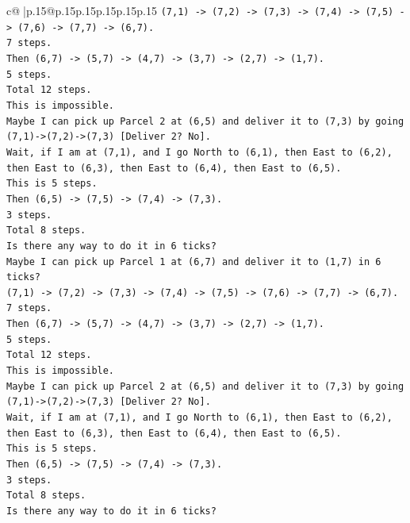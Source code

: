 \documentclass{article}
\begin{document}
{\begin{supertabular}{c@{$\;$}|p{.15\linewidth}@{}p{.15\linewidth}p{.15\linewidth}p{.15\linewidth}p{.15\linewidth}p{.15\linewidth}}
{{{\texttt{(7,1) {-}> (7,2) {-}> (7,3) {-}> (7,4) {-}> (7,5) {-}> (7,6) {-}> (7,7) {-}> (6,7).} \\
\texttt{7 steps.} \\
\texttt{Then (6,7) {-}> (5,7) {-}> (4,7) {-}> (3,7) {-}> (2,7) {-}> (1,7).} \\
\texttt{5 steps.} \\
\texttt{Total 12 steps.} \\
\texttt{This is impossible.} \\
\texttt{Maybe I can pick up Parcel 2 at (6,5) and deliver it to (7,3) by going (7,1){-}>(7,2){-}>(7,3) {[}Deliver 2? No{]}.} \\
\texttt{Wait, if I am at (7,1), and I go North to (6,1), then East to (6,2), then East to (6,3), then East to (6,4), then East to (6,5).} \\
\texttt{This is 5 steps.} \\
\texttt{Then (6,5) {-}> (7,5) {-}> (7,4) {-}> (7,3).} \\
\texttt{3 steps.} \\
\texttt{Total 8 steps.} \\
\texttt{Is there any way to do it in 6 ticks?} \\
\texttt{Maybe I can pick up Parcel 1 at (6,7) and deliver it to (1,7) in 6 ticks?} \\
\texttt{(7,1) {-}> (7,2) {-}> (7,3) {-}> (7,4) {-}> (7,5) {-}> (7,6) {-}> (7,7) {-}> (6,7).} \\
\texttt{7 steps.} \\
\texttt{Then (6,7) {-}> (5,7) {-}> (4,7) {-}> (3,7) {-}> (2,7) {-}> (1,7).} \\
\texttt{5 steps.} \\
\texttt{Total 12 steps.} \\
\texttt{This is impossible.} \\
\texttt{Maybe I can pick up Parcel 2 at (6,5) and deliver it to (7,3) by going (7,1){-}>(7,2){-}>(7,3) {[}Deliver 2? No{]}.} \\
\texttt{Wait, if I am at (7,1), and I go North to (6,1), then East to (6,2), then East to (6,3), then East to (6,4), then East to (6,5).} \\
\texttt{This is 5 steps.} \\
\texttt{Then (6,5) {-}> (7,5) {-}> (7,4) {-}> (7,3).} \\
\texttt{3 steps.} \\
\texttt{Total 8 steps.} \\
\texttt{Is there any way to do it in 6 ticks?} \\
}}}
\end{supertabular}}
\end{document}
